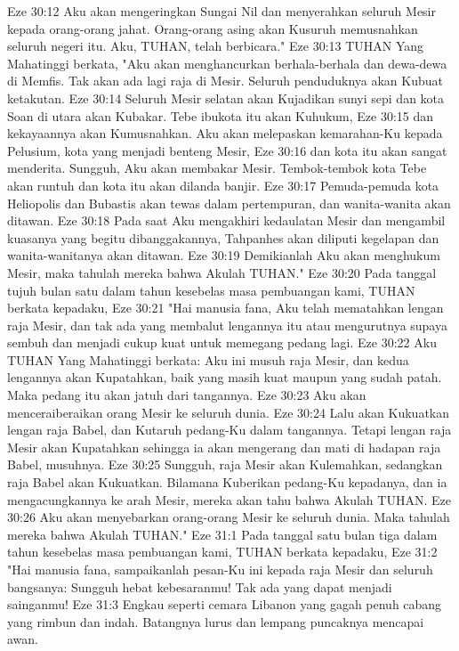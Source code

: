 Eze 30:12  Aku akan mengeringkan Sungai Nil dan menyerahkan seluruh Mesir kepada orang-orang jahat. Orang-orang asing akan Kusuruh memusnahkan seluruh negeri itu. Aku, TUHAN, telah berbicara."
Eze 30:13  TUHAN Yang Mahatinggi berkata, "Aku akan menghancurkan berhala-berhala dan dewa-dewa di Memfis. Tak akan ada lagi raja di Mesir. Seluruh penduduknya akan Kubuat ketakutan.
Eze 30:14  Seluruh Mesir selatan akan Kujadikan sunyi sepi dan kota Soan di utara akan Kubakar. Tebe ibukota itu akan Kuhukum,
Eze 30:15  dan kekayaannya akan Kumusnahkan. Aku akan melepaskan kemarahan-Ku kepada Pelusium, kota yang menjadi benteng Mesir,
Eze 30:16  dan kota itu akan sangat menderita. Sungguh, Aku akan membakar Mesir. Tembok-tembok kota Tebe akan runtuh dan kota itu akan dilanda banjir.
Eze 30:17  Pemuda-pemuda kota Heliopolis dan Bubastis akan tewas dalam pertempuran, dan wanita-wanita akan ditawan.
Eze 30:18  Pada saat Aku mengakhiri kedaulatan Mesir dan mengambil kuasanya yang begitu dibanggakannya, Tahpanhes akan diliputi kegelapan dan wanita-wanitanya akan ditawan.
Eze 30:19  Demikianlah Aku akan menghukum Mesir, maka tahulah mereka bahwa Akulah TUHAN."
Eze 30:20  Pada tanggal tujuh bulan satu dalam tahun kesebelas masa pembuangan kami, TUHAN berkata kepadaku,
Eze 30:21  "Hai manusia fana, Aku telah mematahkan lengan raja Mesir, dan tak ada yang membalut lengannya itu atau mengurutnya supaya sembuh dan menjadi cukup kuat untuk memegang pedang lagi.
Eze 30:22  Aku TUHAN Yang Mahatinggi berkata: Aku ini musuh raja Mesir, dan kedua lengannya akan Kupatahkan, baik yang masih kuat maupun yang sudah patah. Maka pedang itu akan jatuh dari tangannya.
Eze 30:23  Aku akan menceraiberaikan orang Mesir ke seluruh dunia.
Eze 30:24  Lalu akan Kukuatkan lengan raja Babel, dan Kutaruh pedang-Ku dalam tangannya. Tetapi lengan raja Mesir akan Kupatahkan sehingga ia akan mengerang dan mati di hadapan raja Babel, musuhnya.
Eze 30:25  Sungguh, raja Mesir akan Kulemahkan, sedangkan raja Babel akan Kukuatkan. Bilamana Kuberikan pedang-Ku kepadanya, dan ia mengacungkannya ke arah Mesir, mereka akan tahu bahwa Akulah TUHAN.
Eze 30:26  Aku akan menyebarkan orang-orang Mesir ke seluruh dunia. Maka tahulah mereka bahwa Akulah TUHAN."
Eze 31:1  Pada tanggal satu bulan tiga dalam tahun kesebelas masa pembuangan kami, TUHAN berkata kepadaku,
Eze 31:2  "Hai manusia fana, sampaikanlah pesan-Ku ini kepada raja Mesir dan seluruh bangsanya: Sungguh hebat kebesaranmu! Tak ada yang dapat menjadi sainganmu!
Eze 31:3  Engkau seperti cemara Libanon yang gagah penuh cabang yang rimbun dan indah. Batangnya lurus dan lempang puncaknya mencapai awan.
